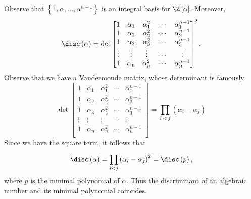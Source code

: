 \documentclass[pmath441]{subfiles}
\begin{document}
    \np Observe that $\left\lbrace 1,\alpha,\ldots,\alpha^{n-1} \right\rbrace$ is an integral basis for $\Z\left[ \alpha \right]$. Moreover,
    \begin{equation*}
        \disc\left( \alpha \right) = \det
        \begin{bmatrix}
            1 & \alpha_1 & \alpha_1^{2} & \cdots & \alpha_1^{n-1} \\
            1 & \alpha_2 & \alpha_2^{2} & \cdots & \alpha_2^{n-1} \\
            1 & \alpha_3 & \alpha_3^{2} & \cdots & \alpha_3^{n-1} \\
            \vdots & \vdots & \vdots & \cdots & \vdots \\
            1 & \alpha_n & \alpha_n^{2} & \cdots & \alpha_n^{n-1} \\
        \end{bmatrix}^{2}.
    \end{equation*}
    Observe that we have a Vandermonde matrix, whose determinant is famously 
    \begin{equation*}
        \det
        \begin{bmatrix}
            1 & \alpha_1 & \alpha_1^{2} & \cdots & \alpha_1^{n-1} \\
            1 & \alpha_2 & \alpha_2^{2} & \cdots & \alpha_2^{n-1} \\
            1 & \alpha_3 & \alpha_3^{2} & \cdots & \alpha_3^{n-1} \\
            \vdots & \vdots & \vdots & \cdots & \vdots \\
            1 & \alpha_n & \alpha_n^{2} & \cdots & \alpha_n^{n-1} \\
        \end{bmatrix} = \prod^{}_{i<j} \left( \alpha_i-\alpha_j \right)
    \end{equation*}
    Since we have the square term, it follows that
    \begin{equation*}
        \disc\left( \alpha \right) = \prod^{}_{i<j}\left( \alpha_i-\alpha_j \right)^{2} = \disc\left( p \right),
    \end{equation*}
    where $p$ is the minimal polynomial of $\alpha$. Thus the discriminant of an algebraic number and its minimal polynomial coincides.
    
\end{document}
